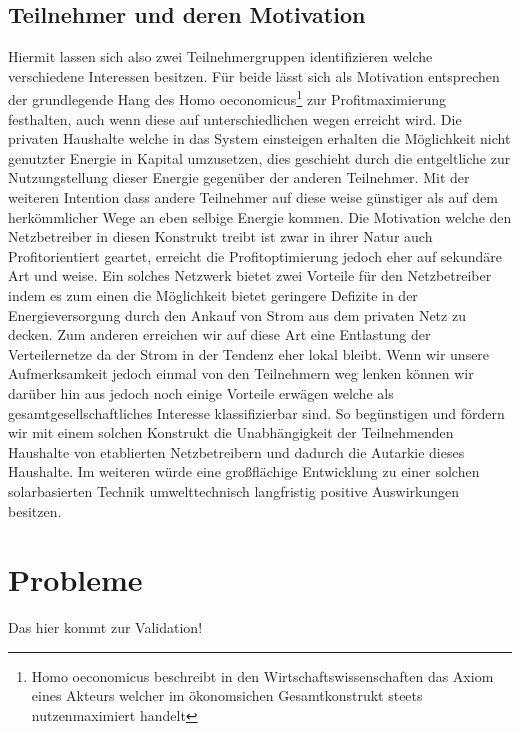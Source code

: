 \subsection{Teilnehmer und deren Motivation}
Hiermit lassen sich also zwei Teilnehmergruppen identifizieren welche verschiedene Interessen besitzen. Für beide lässt sich als Motivation entsprechen der grundlegende Hang des Homo oeconomicus\footnote{Homo oeconomicus beschreibt in den Wirtschaftswissenschaften das Axiom eines Akteurs welcher im ökonomsichen Gesamtkonstrukt steets nutzenmaximiert handelt} zur Profitmaximierung festhalten, auch wenn diese auf unterschiedlichen wegen erreicht wird. Die privaten Haushalte welche in das System einsteigen erhalten die Möglichkeit nicht genutzter Energie in Kapital umzusetzen, dies geschieht durch die entgeltliche zur Nutzungstellung dieser Energie gegenüber der anderen Teilnehmer.  Mit der weiteren Intention dass andere Teilnehmer auf diese weise günstiger als auf dem herkömmlicher Wege an eben selbige Energie kommen. Die Motivation welche den Netzbetreiber in diesen Konstrukt treibt ist zwar in ihrer Natur auch Profitorientiert geartet, erreicht die Profitoptimierung jedoch eher auf sekundäre Art und weise.  Ein solches Netzwerk bietet zwei Vorteile für den Netzbetreiber indem es zum einen die Möglichkeit bietet geringere Defizite in der Energieversorgung durch den Ankauf von Strom aus dem privaten Netz zu decken. Zum anderen erreichen wir auf diese Art eine Entlastung der Verteilernetze da der Strom in der Tendenz eher lokal bleibt. Wenn wir unsere Aufmerksamkeit jedoch einmal von den Teilnehmern weg lenken können wir darüber hin aus jedoch noch einige Vorteile erwägen welche als gesamtgesellschaftliches Interesse klassifizierbar sind. So begünstigen und fördern wir mit einem solchen  Konstrukt die Unabhängigkeit der Teilnehmenden Haushalte von etablierten Netzbetreibern und dadurch die Autarkie dieses Haushalte. Im weiteren würde eine großflächige Entwicklung zu einer solchen solarbasierten Technik umwelttechnisch langfristig positive Auswirkungen besitzen.

\section{Probleme}
Das hier kommt zur Validation!
